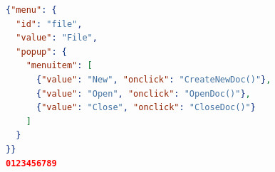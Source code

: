 \begin{lstlisting}[language=json,firstnumber=1,caption={Un listado},label={code:ejemplo}]
{"menu": {
  "id": "file",
  "value": "File",
  "popup": {
    "menuitem": [
      {"value": "New", "onclick": "CreateNewDoc()"},
      {"value": "Open", "onclick": "OpenDoc()"},
      {"value": "Close", "onclick": "CloseDoc()"}
    ]
  }
}}
0123456789
\end{lstlisting}
